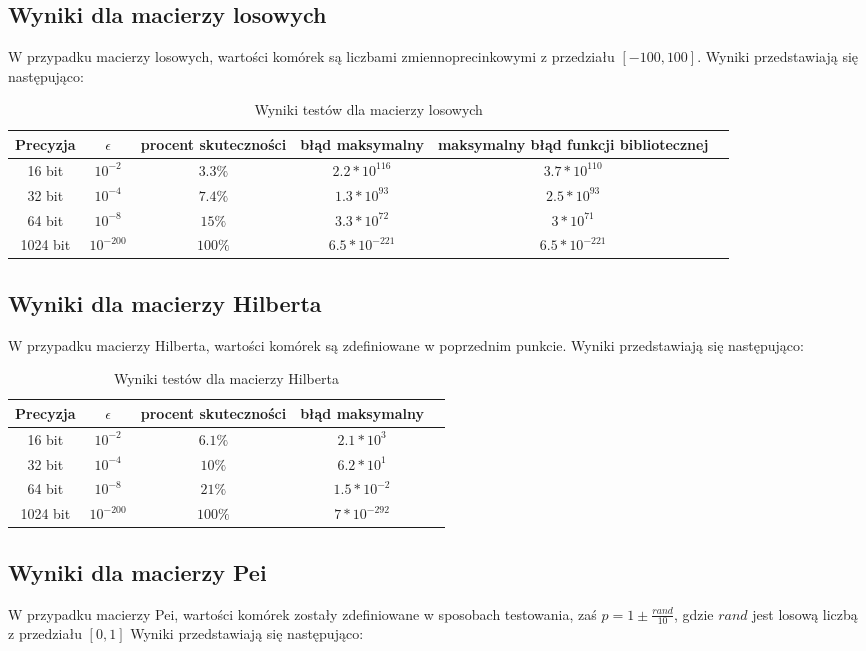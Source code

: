 \documentclass{article}
\begin{document}
\subsection{Wyniki dla macierzy losowych}
W przypadku macierzy losowych, wartości komórek są liczbami zmiennoprecinkowymi z przedziału $[-100,100]$. Wyniki przedstawiają się następująco:

\begin{table}[htbp]
\centering
\caption[Short Heading]{Wyniki testów dla macierzy losowych}
\begin{tabular}{|c|c|c|c|c|c|} \hline
Precyzja & $\epsilon$ & procent skuteczności & błąd maksymalny& maksymalny błąd funkcji bibliotecznej\\ \hline
16 bit & $10^{-2}$ & $3.3 \%$ & $2.2*10^{116}$ & $3.7*10^{110}$\\ \hline
32 bit & $10^{-4}$ & $7.4 \%$ & $1.3*10^{93}$ & $2.5*10^{93}$\\ \hline
64 bit & $10^{-8}$ &  $15 \%$ & $3.3*10^{72}$ & $3*10^{71}$\\ \hline
1024 bit & $10^{-200}$ & $100 \%$ & $6.5*10^{-221}$ & $6.5*10^{-221}$\\ \hline
\end{tabular}
\end{table}

\subsection{Wyniki dla macierzy Hilberta}
W przypadku macierzy Hilberta, wartości komórek są zdefiniowane w poprzednim punkcie. Wyniki przedstawiają się następująco:

\begin{table}[htbp]
\centering
\caption[Short Heading]{Wyniki testów dla macierzy Hilberta}
\begin{tabular}{|c|c|c|c|c|} \hline
Precyzja & $\epsilon$ & procent skuteczności & błąd maksymalny\\ \hline
16 bit & $10^{-2}$ & $6.1 \%$ & $2.1*10^{3}$\\ \hline
32 bit & $10^{-4}$ & $10 \%$ & $6.2*10^{1}$\\ \hline
64 bit & $10^{-8}$ & $21 \%$ & $1.5*10^{-2}$\\ \hline
1024 bit & $10^{-200}$ & $100 \%$ & $7*10^{-292}$\\ \hline
\end{tabular}
\end{table}

\subsection{Wyniki dla macierzy Pei}
W przypadku macierzy Pei, wartości komórek zostały zdefiniowane w sposobach testowania, zaś $p=1 \pm \frac{rand}{10}$, gdzie $rand$ jest losową liczbą z przedziału $[0,1]$ Wyniki przedstawiają się następująco:
\end{document}
